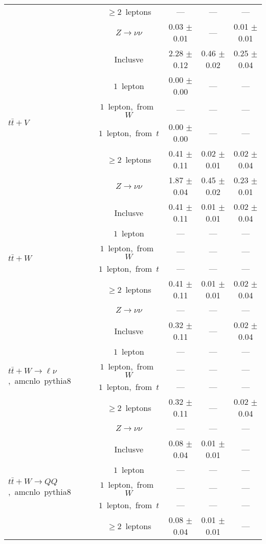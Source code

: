 \documentclass{article}
\begin{document}
\begin{longtable}{|l|c|c|c|c|}
 & $\ge2$~leptons  & ---  & ---  & --- \\* 
 & $Z\rightarrow\nu\nu$  & 0.03 $\pm$ 0.01  & ---  & 0.01 $\pm$ 0.01 \\* 
\hline 
\multirow{6}{*}{$t\bar{t}+V$} & Inclusve  & 2.28 $\pm$ 0.12  & 0.46 $\pm$ 0.02  & 0.25 $\pm$ 0.04 \\* 
 & $1$~lepton  & 0.00 $\pm$ 0.00  & ---  & --- \\* 
 & $1$~lepton,~from~$W$  & ---  & ---  & --- \\* 
 & $1$~lepton,~from~$t$  & 0.00 $\pm$ 0.00  & ---  & --- \\* 
 & $\ge2$~leptons  & 0.41 $\pm$ 0.11  & 0.02 $\pm$ 0.01  & 0.02 $\pm$ 0.04 \\* 
 & $Z\rightarrow\nu\nu$  & 1.87 $\pm$ 0.04  & 0.45 $\pm$ 0.02  & 0.23 $\pm$ 0.01 \\* 
\hline 
\multirow{6}{*}{$t\bar{t}+W$} & Inclusve  & 0.41 $\pm$ 0.11  & 0.01 $\pm$ 0.01  & 0.02 $\pm$ 0.04 \\* 
 & $1$~lepton  & ---  & ---  & --- \\* 
 & $1$~lepton,~from~$W$  & ---  & ---  & --- \\* 
 & $1$~lepton,~from~$t$  & ---  & ---  & --- \\* 
 & $\ge2$~leptons  & 0.41 $\pm$ 0.11  & 0.01 $\pm$ 0.01  & 0.02 $\pm$ 0.04 \\* 
 & $Z\rightarrow\nu\nu$  & ---  & ---  & --- \\* 
\hline 
\multirow{6}{*}{$t\bar{t}+W{\rightarrow}{\ell}{\nu}$,~amcnlo~pythia8} & Inclusve  & 0.32 $\pm$ 0.11  & ---  & 0.02 $\pm$ 0.04 \\* 
 & $1$~lepton  & ---  & ---  & --- \\* 
 & $1$~lepton,~from~$W$  & ---  & ---  & --- \\* 
 & $1$~lepton,~from~$t$  & ---  & ---  & --- \\* 
 & $\ge2$~leptons  & 0.32 $\pm$ 0.11  & ---  & 0.02 $\pm$ 0.04 \\* 
 & $Z\rightarrow\nu\nu$  & ---  & ---  & --- \\* 
\hline 
\multirow{6}{*}{$t\bar{t}+W{\rightarrow}QQ$,~amcnlo~pythia8} & Inclusve  & 0.08 $\pm$ 0.04  & 0.01 $\pm$ 0.01  & --- \\* 
 & $1$~lepton  & ---  & ---  & --- \\* 
 & $1$~lepton,~from~$W$  & ---  & ---  & --- \\* 
 & $1$~lepton,~from~$t$  & ---  & ---  & --- \\* 
 & $\ge2$~leptons  & 0.08 $\pm$ 0.04  & 0.01 $\pm$ 0.01  & --- \\* 

\end{longtable}
\end{document}
